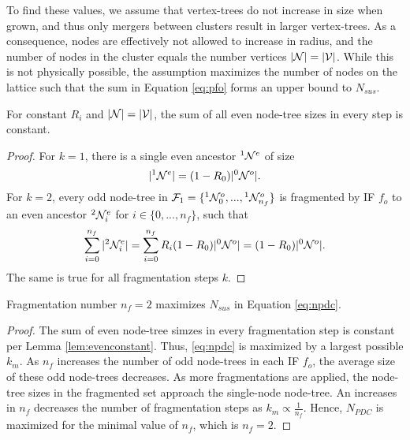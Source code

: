 To find these values, we assume that vertex-trees do not increase in size  when grown, and thus only mergers between clusters result in larger vertex-trees. As a consequence, nodes are effectively not allowed to increase in radius, and the number of nodes in the cluster equals the number vertices $\lvert\mathcal{N}\rvert=\lvert\mathcal{V}\rvert$. While this is not physically possible, the assumption maximizes the number of nodes on the lattice such that the sum in Equation \eqref{eq:pfo} forms an upper bound to $N_{sus}$.

\begin{lemma}\label{lem:evenconstant}
  For constant $R_i$ and $\lvert\mathcal{N}\rvert=\lvert\mathcal{V}\rvert$, the sum of all even node-tree sizes in every step is constant. 
\end{lemma}
\begin{proof}
  For $k=1$, there is a single even ancestor ${}^{1}\mathcal{N}^e$ of size 
  \begin{equation*}
    \lvert{}^{1}\mathcal{N}^e\rvert = (1 - R_0)\lvert{}^{0}\mathcal{N}^o\rvert.
  \end{equation*}
  For $k=2$, every odd node-tree in $\mathcal{F}_1=\{{}^{1}\mathcal{N}^o_0,...,{}^{1}\mathcal{N}^{o}_{n_f}\}$ is fragmented by IF $f_o$ to an even ancestor ${}^{2}\mathcal{N}^e_i$ for $i \in \{0,...,n_f \}$, such that 
  \begin{equation*}
    \sum_{i=0}^{n_f}{\lvert{}^{2}\mathcal{N}^e_i\rvert}  = \sum_{i=0}^{n_f}{R_i(1 - R_0)\lvert{}^{0}\mathcal{N}^o\rvert}= (1 - R_0)\lvert{}^{0}\mathcal{N}^o\rvert.
  \end{equation*}
  The same is true for all fragmentation steps $k$. 
\end{proof}

\begin{theorem}\label{the:fragnumber}
  Fragmentation number $n_f=2$ maximizes $N_{sus}$ in Equation \eqref{eq:npdc}.
\end{theorem}
\begin{proof}
  The sum of even node-tree simzes in every fragmentation step is constant per Lemma \ref{lem:evenconstant}. Thus, \eqref{eq:npdc} is maximized by a largest possible $k_m$.  As $n_f$ increases the number of odd node-trees in each IF $f_o$, the average size of these odd node-trees decreases. As more fragmentations are applied, the node-tree sizes in the fragmented set approach the single-node node-tree. An increases in $n_f$ decreases the number of fragmentation steps as $ k_m \propto \frac{1}{n_f}$.  Hence, $N_{PDC}$ is maximized for the minimal value of $n_f$, which is $n_f = 2$.
\end{proof}

